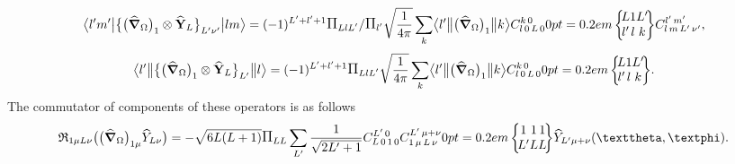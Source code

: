 \begin{equation}
\braOket{ l^{\prime} m^{\prime}}{\bigl\{\bigl(\delop_{\Omega}\bigr)_{1} \otimes \widehat{\vect{Y}}_{L}\bigr\}_{L^{\prime} \nu^{\prime}}}{l m}=(-1)^{L^{\prime}+l^{\prime}+1} 
\Fact{L l L^\prime}/\Fact{l^\prime}\sqrt{\frac{1}{4 \pi}} \sum_{k}
\braOketred{ l^{\prime}}{\bigl(\delop_{\Omega}\bigr)_{1}}{ k} 
\clebsch{l}{0}{L}{0}{k}{0}
\sixj{L}{1}{L^{\prime}}{l^{\prime}}{l}{k} 
\clebsch{l}{m}{L^{\prime}}{\nu^{\prime}}{l^{\prime}}{m^{\prime}}, \label{eq:13:2:111}
\end{equation}
\begin{equation*}
\braOketred{ l^{\prime}}{\bigl\{\bigl(\delop_{\Omega}\bigr)_{1} \otimes \widehat{\vect{Y}}_{L}\bigr\}_{L^{\prime}}}{ l}=(-1)^{L^{\prime}+l^{\prime}+1}
\Fact{L l L^\prime}\sqrt{\frac{1}{4 \pi}} 
 \sum_{k}
\braOketred{ l^{\prime}}{\bigl(\delop_{\Omega}\bigr)_{1}}{ k}
\clebsch{l}{0}{L}{0}{k}{0}
\sixj{L}{1}{L^{\prime}}{l^{\prime}}{l}{k}.
\end{equation*}
The commutator of components of these operators is as follows
\begin{equation}
\mathfrak{R}_{1 \mu L \nu}\bigl(\bigl(\delop_{\Omega}\bigr)_{1 \mu} \widehat{Y}_{L \nu}\bigr)=-\sqrt{6 L(L+1)}\Fact{L L} \sum_{L^{\prime}} \frac{1}{\sqrt{2 L^{\prime}+1}} 
\clebsch{L}{0}{1}{0}{L^{\prime}}{0} 
\clebsch{1}{\mu}{L}{\nu}{L^{\prime}}{\mu+\nu}
\sixj{1}{1}{1}{L^{\prime}}{L}{L}
 \widehat{Y}_{L^{\prime} \mu+\nu}(\vartheta, \varphi). \label{eq:13:2:112}
\end{equation}

